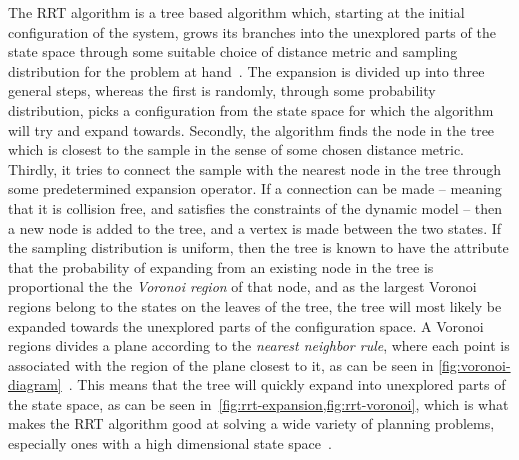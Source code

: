 The \ac{RRT} algorithm is a tree based algorithm which, starting at the initial
configuration of the system, grows its branches into the unexplored parts of the
state space through some suitable choice of distance metric and sampling
distribution for the problem at hand~\cite{article}. The expansion is divided up
into three general steps, whereas the first is randomly, through some
probability distribution, picks a configuration from the state space for which
the algorithm will try and expand towards. Secondly, the algorithm finds the
node in the tree which is closest to the sample in the sense of some chosen
distance metric. Thirdly, it tries to connect the sample with the nearest node
in the tree through some predetermined expansion operator. If a connection can
be made -- meaning that it is collision free, and satisfies the constraints of
the dynamic model -- then a new node is added to the tree, and a vertex is made
between the two states. If the sampling distribution is uniform, then the tree
is known to have the attribute that the probability of expanding from an
existing node in the tree is proportional the the \textit{Voronoi region} of
that node, and as the largest Voronoi regions belong to the states on the leaves
of the tree, the tree will most likely be expanded towards the unexplored parts
of the configuration space. A Voronoi regions divides a plane according to the
\textit{nearest neighbor rule}, where each point is associated with the region
of the plane closest to it, as can be seen in
\cref{fig:voronoi-diagram}~\cite{aurenhammerVoronoiDiagramsSurvey1991}. This
means that the tree will quickly expand into unexplored parts of the state
space, as can be seen in~\cref{fig:rrt-expansion,fig:rrt-voronoi}, which is what
makes the \ac{RRT} algorithm good at solving a wide variety of planning
problems, especially ones with a high dimensional state space~\cite{Lav06}.

\begin{figure}
  \centering 
\end{figure}

